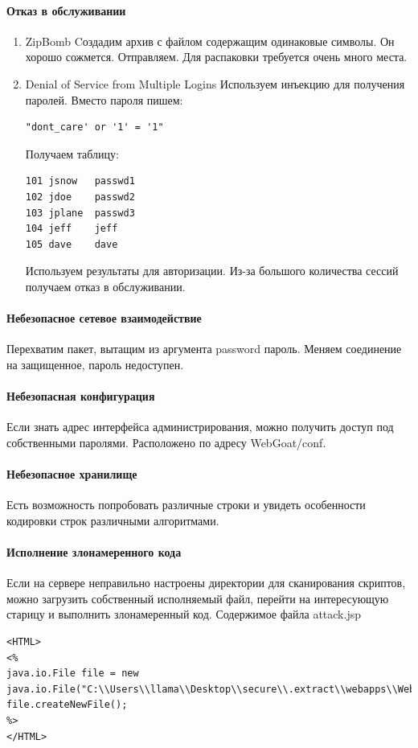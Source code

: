 \documentclass[10pt,a4paper]{article}
\begin{document}
\paragraph{Отказ в обслуживании}
\begin{enumerate}
\item ZipBomb 
Cоздадим архив с файлом содержащим одинаковые символы. Он хорошо сожмется. Отправляем. Для распаковки требуется очень много места.
\item Denial of Service from Multiple Logins
Используем инъекцию для получения паролей. Вместо пароля пишем:
\begin{verbatim}
"dont_care' or '1' = '1"
\end{verbatim}
Получаем таблицу:
\begin{verbatim}
101	jsnow	passwd1	
102	jdoe	passwd2	
103	jplane	passwd3	
104	jeff	jeff	
105	dave	dave	
\end{verbatim}
Используем результаты для авторизации. Из-за большого количества сессий получаем отказ в обслуживании.
\end{enumerate}

\paragraph{Небезопасное сетевое взаимодействие}
Перехватим пакет, вытащим из аргумента password пароль. Меняем соединение на защищенное, пароль недоступен.
\paragraph{Небезопасная конфигурация}
Если знать адрес интерфейса администрирования, можно получить доступ под собственными паролями.
Расположено по адресу WebGoat/conf.
\paragraph{Небезопасное хранилище}
Есть возможность попробовать различные строки и увидеть особенности кодировки строк различными алгоритмами.
\paragraph{Исполнение злонамеренного кода}
Если на сервере неправильно настроены директории для сканирования скриптов, можно загрузить собственный исполняемый файл, перейти на интересующую старицу и выполнить злонамеренный код.
Содержимое файла attack.jsp
\begin{verbatim}
<HTML>
<%
java.io.File file = new java.io.File("C:\\Users\\llama\\Desktop\\secure\\.extract\\webapps\\WebGoat\\mfe_target\\webgoat.txt");
file.createNewFile();
%>
</HTML>
\end{verbatim}
\end{document}
